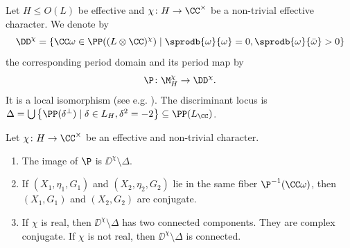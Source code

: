 \begin{definition}
 Let $H\leq O(L)$ be effective and $\chi\colon H \to \CC^\times$ be a non-trivial effective character.
 We denote by
 \[\DD^\chi= \{\CC \omega \in \PP((L\otimes \CC)^\chi) \mid \sprodb{\omega}{\omega}=0, \sprodb{\omega}{\bar\omega}>0\}\]
 the corresponding period domain and its period map by
 \[\P \colon \M_H^\chi \to \DD^\chi.\]
It is a local isomorphism (see e.g. \cite{brandhorst-cattaneo}).
The discriminant locus is $\Delta = \bigcup  \left\{\PP(\delta^\perp) \mid \delta \in L_H, \delta^2=-2\right\} \subseteq \PP(L_\CC)$.
\end{definition}

\begin{proposition}\label{perioddomain}
Let $\chi \colon H \to \CC^\times$ be an effective and non-trivial character.
 \begin{enumerate}
  \item The image of $\P$ is $\DD^\chi \setminus \Delta $.
  \item If $(X_1,\eta_1,G_1)$ and $(X_2,\eta_2,G_2)$ lie in the same fiber $\P^{-1}(\CC \omega)$, then $(X_1,G_1)$ and $(X_2,G_2)$ are conjugate.
  \item If $\chi$ is real, then $\DD^\chi \setminus \Delta $ has two connected components. They are complex conjugate. If $\chi$ is not real, then $\DD^\chi \setminus \Delta$ is connected.
 \end{enumerate}
\end{proposition}
